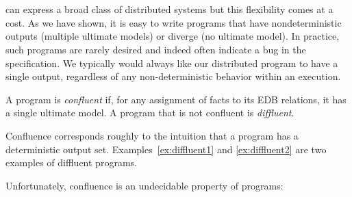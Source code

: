 \section{\slang}
\label{sec:confluence}

\lang can express a broad class of distributed systems but this flexibility comes at a cost.
As we have shown, it is easy to write programs that have nondeterministic
outputs (multiple ultimate models) or diverge (no ultimate model).   In practice, such programs are rarely 
desired and indeed often indicate a bug in the specification.
We typically would always like our distributed program to have a single output, regardless of any non-deterministic behavior within an execution.

\begin{definition}
  A \lang program is {\em confluent} if, for any assignment of facts to its EDB
  relations, it has a single ultimate model.  A program that is not confluent is
  {\em diffluent}.
\end{definition}

Confluence corresponds roughly to the intuition that a program has a
deterministic output set. Examples~\ref{ex:diffluent1} and \ref{ex:diffluent2}
are two examples of diffluent programs.

Unfortunately, confluence is an undecidable property of \lang programs:

